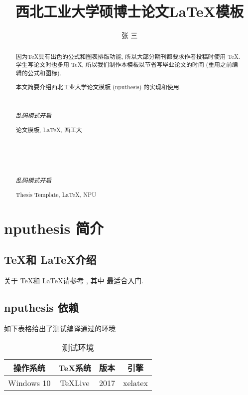 \documentclass[twoside,UTF8,phd]{nputhesis}
\title[\LaTeX\ Template for Thesis of NPU]{西北工业大学硕博士论文\LaTeX 模板}
\author[San Zhang]{张\,\,三}
\theoremstyle{plain}
\begin{document}
\makecover  %
\frontmatter

\begin{abstract}  
    因为\TeX 具有出色的公式和图表排版功能, 所以大部分期刊都要求作者投稿时使用
    \TeX. 学生写论文时也多用 \TeX, 所以我们制作本模板以节省写毕业论文的时间 
    (重用之前编辑的公式和图标).

    本文简要介绍西北工业大学论文模板 (nputhesis) 的实现和使用.

    { %
        \noindent\hrulefill\\
        {\centerline {\it 乱码模式开启}}
        \noindent\hrulefill
    }
    \begin{keywords}
        论文模板, \LaTeX, 西工大 
    \end{keywords}
\end{abstract}

\begin{Abstract}
    { %
        \noindent\hrulefill\\
        {\centerline {\it 乱码模式开启}}
        \noindent\hrulefill
    }
    \begin{Keywords}
        Thesis Template, \LaTeX, NPU
    \end{Keywords}
\end{Abstract}

\tableofcontents 

\mainmatter  %
\chapter{nputhesis 简介}

\section{\TeX 和 \LaTeX 介绍}
关于 \TeX 和 \LaTeX 请参考 \cite{Knuth1986,Lamport1994,Liu2013}, 其中 \cite{Liu2013} 最适合入门.  

\section{nputhesis 依赖}
如下表格给出了测试编译通过的环境
\begin{table}[h]
  \caption{测试环境\cite{Liu2013}}
    \centering
    \begin{tabular}{cccc}
        \toprule
        操作系统    & \TeX 系统   & 版本  & 引擎\\
        \midrule
        Windows 10  & TeXLive     & 2017  & xelatex\\
        \bottomrule
    \end{tabular}
\end{table}
\lipsum[9-15]
\end{document}
